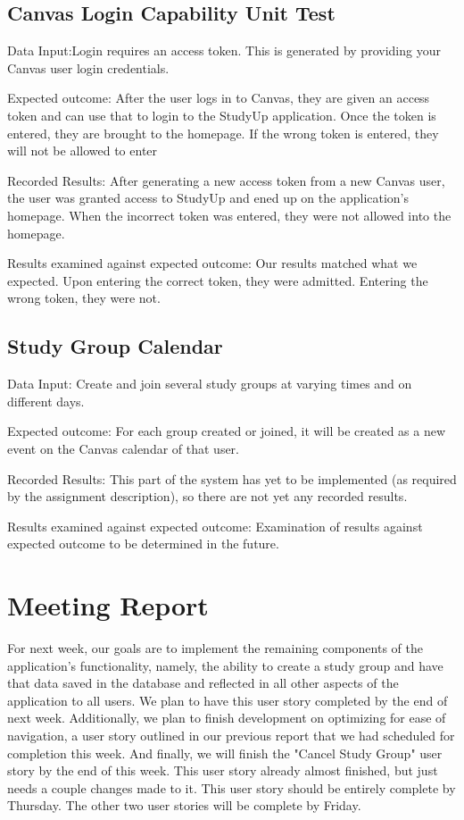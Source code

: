\documentclass[12pt,letterpaper]{article}
\begin{document}
\subsection{Canvas Login Capability Unit Test}
Data Input:Login requires an access token. This is generated by providing your Canvas user login credentials.

Expected outcome: After the user logs in to Canvas, they are given an access token and can use that to login to the StudyUp application. Once the token is entered, they are brought to the homepage. If the wrong token is entered, they will not be allowed to enter

Recorded Results: After generating a new access token from a new Canvas user, the user was granted access to StudyUp and ened up on the application's homepage. When the incorrect token was entered, they were not allowed into the homepage.

Results examined against expected outcome: Our results matched what we expected. Upon entering the correct token, they were admitted. Entering the wrong token, they were not.
\subsection{Study Group Calendar}
Data Input: Create and join several study groups at varying times and on different days.

Expected outcome: For each group created or joined, it will be created as a new event on the Canvas calendar of that user. 

Recorded Results: This part of the system has yet to be implemented (as required by the assignment description), so there are not yet any recorded results.

Results examined against expected outcome: Examination of results against expected outcome to be determined in the future. 


\section{Meeting Report}
For next week, our goals are to implement the remaining components of the application's functionality, namely, the ability to create a study group and have that data saved in the database and reflected in all other aspects of the application to all users. We plan to have this user story completed by the end of next week. Additionally, we plan to finish development on optimizing for ease of navigation, a user story outlined in our previous report that we had scheduled for completion this week. And finally, we will finish the "Cancel Study Group" user story by the end of this week. This user story already almost finished, but just needs a couple changes made to it. This user story should be entirely complete by Thursday. The other two user stories will be complete by Friday. 
\end{document}

